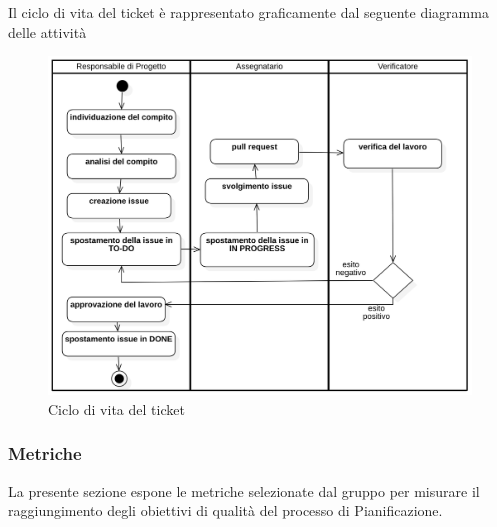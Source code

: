             Il ciclo di vita del ticket è rappresentato graficamente dal seguente diagramma delle attività
            \begin{figure}[H]
                    \centering
                    \includegraphics[width=1.0\textwidth]{res/images/ciclo_di_vita_del_ticket.png}
                \caption{Ciclo di vita del ticket}
                \label{Ciclo di vita del ticket}
            \end{figure}
        \subsubsection{Metriche}
            La presente sezione espone le metriche selezionate dal gruppo per misurare il raggiungimento degli obiettivi di qualità del processo di Pianificazione.
